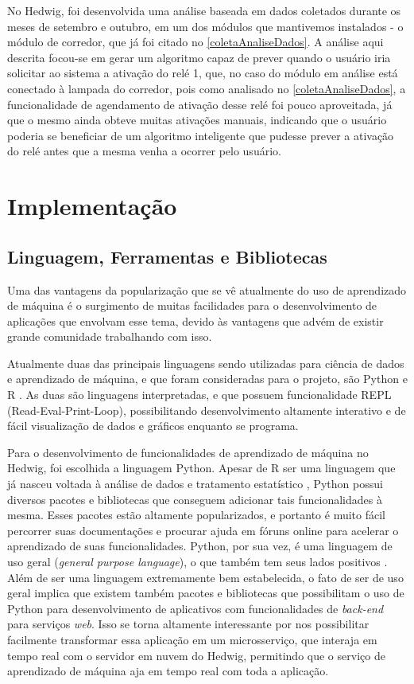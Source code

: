 		No Hedwig, foi desenvolvida uma análise baseada em dados coletados durante os meses de setembro e outubro, em um dos módulos que mantivemos instalados - o módulo de corredor, que já foi citado no \ref{coletaAnaliseDados}. A análise aqui descrita focou-se em gerar um algoritmo capaz de prever quando o usuário iria solicitar ao sistema a ativação do relé 1, que, no caso do módulo em análise está conectado à lampada do corredor, pois como analisado no \ref{coletaAnaliseDados}, a funcionalidade de agendamento de ativação desse relé foi pouco aproveitada, já que o mesmo ainda obteve muitas ativações manuais, indicando que o usuário poderia se beneficiar de um algoritmo inteligente que pudesse prever a ativação do relé antes que a mesma venha a ocorrer pelo usuário.

	\section{Implementação}

		\subsection{Linguagem, Ferramentas e Bibliotecas}

			Uma das vantagens da popularização que se vê atualmente do uso de aprendizado de máquina é o surgimento de muitas facilidades para o desenvolvimento de aplicações que envolvam esse tema, devido às vantagens que advém de existir grande comunidade trabalhando com isso.

			Atualmente duas das principais linguagens sendo utilizadas para ciência de dados e aprendizado de máquina, e que foram consideradas para o projeto, são Python e R \cite{languagesForML}. As duas são linguagens interpretadas, e que possuem funcionalidade REPL (Read-Eval-Print-Loop), possibilitando desenvolvimento altamente interativo e de fácil visualização de dados e gráficos enquanto se programa.

			Para o desenvolvimento de funcionalidades de aprendizado de máquina no Hedwig, foi escolhida a linguagem Python. Apesar de R ser uma linguagem que já nasceu voltada à análise de dados e tratamento estatístico \cite{rLanguage}, Python possui diversos pacotes e bibliotecas que conseguem adicionar tais funcionalidades à mesma. Esses pacotes estão altamente popularizados, e portanto é muito fácil percorrer suas documentações e procurar ajuda em fóruns online para acelerar o aprendizado de suas funcionalidades. Python, por sua vez, é uma linguagem de uso geral (\emph{general purpose language}), o que também tem seus lados positivos \cite{pythonApplications}. Além de ser uma linguagem extremamente bem estabelecida, o fato de ser de uso geral implica que existem também pacotes e bibliotecas que possibilitam o uso de Python para desenvolvimento de aplicativos com funcionalidades de \emph{back-end} para serviços \emph{web}. Isso se torna altamente interessante por nos possibilitar facilmente transformar essa aplicação em um microsserviço, que interaja em tempo real com o servidor em nuvem do Hedwig, permitindo que o serviço de aprendizado de máquina aja em tempo real com toda a aplicação.

